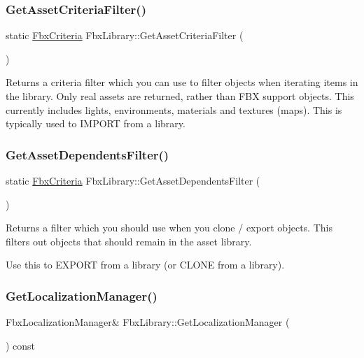\subsubsection{\texorpdfstring{Get\+Asset\+Criteria\+Filter()}{GetAssetCriteriaFilter()}}
{\footnotesize\ttfamily static \hyperlink{class_fbx_criteria}{Fbx\+Criteria} Fbx\+Library\+::\+Get\+Asset\+Criteria\+Filter (\begin{DoxyParamCaption}{ }\end{DoxyParamCaption})\hspace{0.3cm}{\ttfamily [static]}}

Returns a criteria filter which you can use to filter objects when iterating items in the library. Only real \textquotesingle{}assets\textquotesingle{} are returned, rather than F\+BX support objects. This currently includes lights, environments, materials and textures (maps). This is typically used to I\+M\+P\+O\+RT from a library. \mbox{\label{class_fbx_library_a88507d4654d1a906ea7999165af7d92b}} 
\subsubsection{\texorpdfstring{Get\+Asset\+Dependents\+Filter()}{GetAssetDependentsFilter()}}
{\footnotesize\ttfamily static \hyperlink{class_fbx_criteria}{Fbx\+Criteria} Fbx\+Library\+::\+Get\+Asset\+Dependents\+Filter (\begin{DoxyParamCaption}{ }\end{DoxyParamCaption})\hspace{0.3cm}{\ttfamily [static]}}

Returns a filter which you should use when you clone / export objects. This filters out objects that should remain in the asset library.

Use this to E\+X\+P\+O\+RT from a library (or C\+L\+O\+NE from a library). \mbox{\label{class_fbx_library_a4fefd2b63aa4db5519af446945c0adef}} 
\subsubsection{\texorpdfstring{Get\+Localization\+Manager()}{GetLocalizationManager()}}
{\footnotesize\ttfamily Fbx\+Localization\+Manager\& Fbx\+Library\+::\+Get\+Localization\+Manager (\begin{DoxyParamCaption}{ }\end{DoxyParamCaption}) const}

